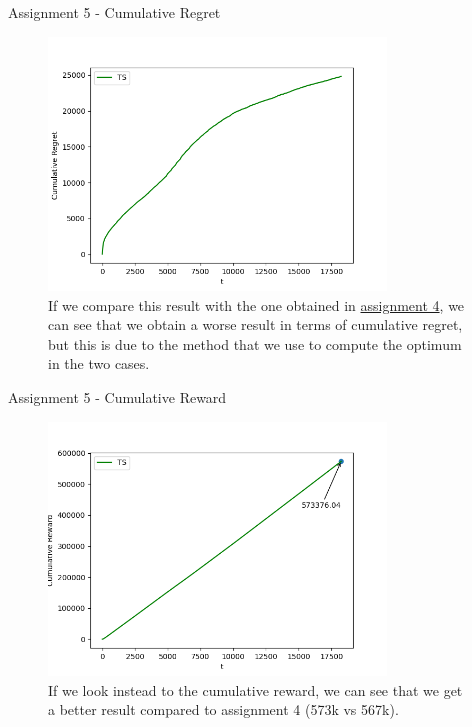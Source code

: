 \documentclass[11pt]{beamer}
\begin{document}
\begin{frame}{Assignment 5 - Cumulative Regret}
\begin{figure}[hbtp]
\centering
\includegraphics[width=0.8\textwidth]{images/assignment_5_cum_regret.png}
\caption{If we compare this result with the one obtained in \hyperlink{page.37}{assignment 4}, we can see that we obtain a worse result in terms of cumulative regret, but this is due to the method that we use to compute the optimum in the two cases.}
\end{figure}
\end{frame}

\begin{frame}{Assignment 5 - Cumulative Reward}
\begin{figure}[hbtp]
\centering
\includegraphics[width=0.8\textwidth]{images/assignment_5_reward.png}
\caption{If we look instead to the cumulative reward, we can see that we get a better result compared to assignment 4 (573k vs 567k). }
\end{figure}
\end{frame}
\end{document}

